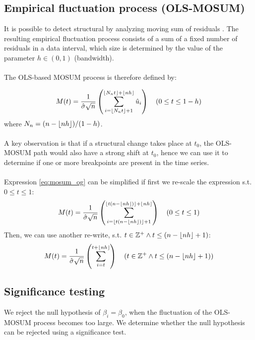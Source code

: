 \documentclass[main.tex]{subfiles}
\begin{document}
\subsection{Empirical fluctuation process (OLS-MOSUM)}
\label{subsec:empirical_fluctuation}
It is possible to detect structural by analyzing moving sum of residuals
\cite{strucchange}. The resulting empirical fluctuation process consists of a
sum of a fixed number of residuals in a data interval, which size is determined
by the value of the parameter $h \in (0,1)$ (bandwidth).\\\\
The OLS-based MOSUM process is therefore defined by:

\begin{equation}\label{eq:mosum_og}
M(t)=\frac{1}{\hat{\sigma} \sqrt{n}}
\left(\sum_{i=\lfloor N_{n} t\rfloor+1}^{\left\lfloor N_{n} t\right\rfloor+\lfloor
  n h\rfloor} \hat{u}_{i}\right) \quad(0 \leq t \leq 1-h)
\end{equation}
where $N_{n}=(n-\lfloor n h\rfloor) /(1-h)$.\\\\
A key observation is that if a structural change takes place at $t_0$, the
OLS-MOSUM path would also have a strong shift at $t_0$, hence we can use it to
determine if one or more breakpoints are present in the time series.\\\\
Expression \ref{eq:mosum_og} can be simplified if first we re-scale the expression s.t. $0 \leq t \leq 1$:
\begin{equation}
  M(t) =
  \frac{1}{\hat{\sigma} \sqrt{n}}
  \left(\sum_{i=\lfloor t(n - \lfloor nh\rfloor)\rfloor + 1}^{\lfloor t(n - \lfloor nh\rfloor)\rfloor + \lfloor nh\rfloor}\right)
  \quad(0 \leq t \leq 1)
\end{equation}
Then, we can use another re-write, s.t.
$t \in \mathbb{Z}^+ \wedge t \leq (n - \lfloor nh\rfloor + 1)$:
\begin{equation} \label{eq:mosum}
  M(t) =
  \frac{1}{\hat{\sigma} \sqrt{n}}
  \left(\sum_{i=t}^{t + \lfloor nh\rfloor}\right)
  \quad(t \in \mathbb{Z}^+ \wedge t \leq (n - \lfloor nh\rfloor + 1))
\end{equation}

\subsection{Significance testing}
\label{subsec:significance_testing}
We reject the null hypothesis of $\beta_i = \beta_0$, when the fluctuation of
the OLS-MOSUM process becomes too large. We determine whether the null
hypothesis can be rejected using a significance test.
\end{document}
